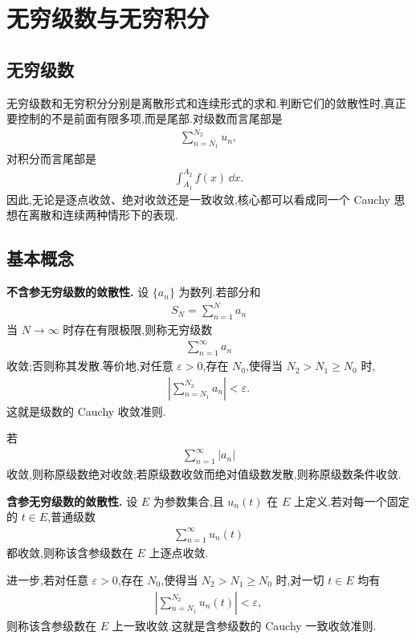 \chapter{无穷级数与无穷积分}


\section{无穷级数}

无穷级数和无穷积分分别是离散形式和连续形式的求和.判断它们的敛散性时,真正要控制的不是前面有限多项,而是尾部.对级数而言尾部是
\begin{align*}
	\sum_{n=N_1}^{N_2}u_n,
\end{align*}
对积分而言尾部是
\begin{align*}
	\int_{A_1}^{A_2}f(x)\,\dd x.
\end{align*}
因此,无论是逐点收敛、绝对收敛还是一致收敛,核心都可以看成同一个 Cauchy 思想在离散和连续两种情形下的表现.

\section{基本概念}

\textbf{不含参无穷级数的敛散性.}
设 $\{a_n\}$ 为数列.若部分和
\begin{align*}
	S_N=\sum_{n=1}^N a_n
\end{align*}
当 $N\to\infty$ 时存在有限极限,则称无穷级数
\begin{align*}
	\sum_{n=1}^{\infty}a_n
\end{align*}
收敛;否则称其发散.等价地,对任意 $\varepsilon>0$,存在 $N_0$,使得当 $N_2>N_1\geq N_0$ 时,
\begin{align*}
	\left|\sum_{n=N_1}^{N_2}a_n\right|<\varepsilon.
\end{align*}
这就是级数的 Cauchy 收敛准则.

若
\begin{align*}
	\sum_{n=1}^{\infty}|a_n|
\end{align*}
收敛,则称原级数绝对收敛;若原级数收敛而绝对值级数发散,则称原级数条件收敛.

\textbf{含参无穷级数的敛散性.}
设 $E$ 为参数集合,且 $u_n(t)$ 在 $E$ 上定义.若对每一个固定的 $t\in E$,普通级数
\begin{align*}
	\sum_{n=1}^{\infty}u_n(t)
\end{align*}
都收敛,则称该含参级数在 $E$ 上逐点收敛.

进一步,若对任意 $\varepsilon>0$,存在 $N_0$,使得当 $N_2>N_1\geq N_0$ 时,对一切 $t\in E$ 均有
\begin{align*}
	\left|\sum_{n=N_1}^{N_2}u_n(t)\right|<\varepsilon,
\end{align*}
则称该含参级数在 $E$ 上一致收敛.这就是含参级数的 Cauchy 一致收敛准则.

